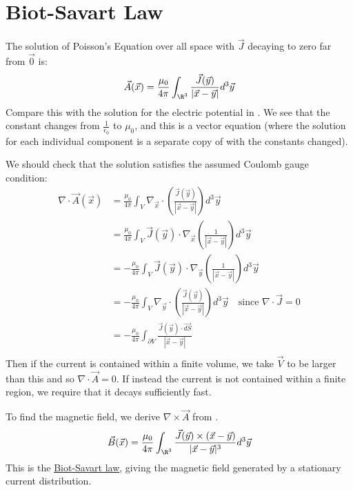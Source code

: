 \documentclass[../Main.tex]{subfiles}
\begin{document}
\section{Biot-Savart Law}
The solution of Poisson's Equation over all space with $\vec{J}$ decaying to zero far from $\vec0$ is:
\begin{equation}
    \vec{A}(\vec{x}) = \frac{\mu_0}{4\pi} \int_{\R^3} \frac{\vec{J}(\vec{y})}{|\vec{x} - \vec{y}|} d^3 \vec{y}
    \label{eqnMagnetSoln}
\end{equation}
Compare this with the solution for the electric potential in . We see that the constant changes from $\frac{1}{\epsilon_0}$ to $\mu_0$, and this is a vector equation (where the solution for each individual component is a separate copy of  with the constants changed).

We should check that the solution satisfies the assumed Coulomb gauge condition:
\begin{align*}
    \nabla \cdot \vec{A}(\vec{x}) &= \frac{\mu_0}{4\pi} \int_V \nabla_{\vec{x}} \cdot \left(\frac{\vec{J}(\vec{y})}{|\vec{x} - \vec{y}|}\right) d^3 \vec{y} \\
    &= \frac{\mu_0}{4\pi} \int_V \vec{J}(\vec{y}) \cdot \nabla_{\vec{x}} \left(\frac{1}{|\vec{x} - \vec{y}|}\right) d^3 \vec{y} \\
    &= -\frac{\mu_0}{4\pi} \int_V \vec{J}(\vec{y}) \cdot \nabla_{\vec{y}} \left(\frac{1}{|\vec{x} - \vec{y}|}\right) d^3 \vec{y} \\
    &= -\frac{\mu_0}{4\pi} \int_V \nabla_{\vec{y}} \cdot \left(\frac{\vec{J}(\vec{y})}{|\vec{x} - \vec{y}|}\right) d^3 \vec{y} \quad\text{since $\nabla \cdot \vec{J} = 0$} \\
    &= -\frac{\mu_0}{4\pi} \int_{\partial V} \frac{\vec{J}(\vec{y}) \cdot \vec{dS}}{|\vec{x} - \vec{y}|} \\
\end{align*}
Then if the current is contained within a finite volume, we take $\vec{V}$ to be larger than this and so $\nabla \cdot \vec{A} = 0$. If instead the current is not contained within a finite region, we require that it decays sufficiently fast.

To find the magnetic field, we derive $\nabla \times \vec{A}$ from .
\begin{equation}
    \vec{B}(\vec{x}) = \frac{\mu_0}{4\pi} \int_{\R^3} \frac{\vec{J}(\vec{y}) \times (\vec{x} - \vec{y})}{|\vec{x} - \vec{y}|^3} d^3 \vec{y}
    \label{eqnBiotSavart}
\end{equation}
This is the \underline{Biot-Savart law}, giving the magnetic field generated by a stationary current distribution.
\end{document}
